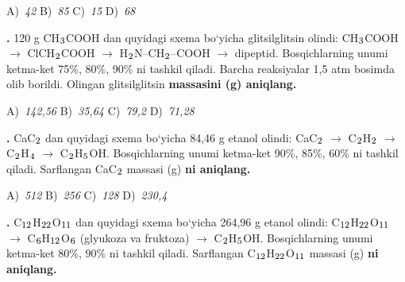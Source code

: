 \documentclass[11pt,a4paper]{article}
\renewcommand{\textsubscript}[1]{\ensuremath{_{\text{\fontsize{8}{8}\selectfont #1}}}}
\newcommand{\qn}[1]{\textbf{\fontsize{11.5}{13}\selectfont #1}}
\newcommand{\qsep}{\par\vspace{13pt}}
\begin{document}
\begin{multicols}{2}
\noindent A)~\textsl{42} \hfill B)~\textsl{85} \hfill C)~\textsl{15} \hfill D)~\textsl{68}\par
\qsep
\noindent\qn{27.} 120 g CH\textsubscript{3}COOH dan quyidagi sxema bo`yicha glitsilglitsin olindi: CH\textsubscript{3}COOH $\to$ ClCH\textsubscript{2}COOH $\to$ H\textsubscript{2}N--CH\textsubscript{2}--COOH $\to$ dipeptid. Bosqichlarning unumi ketma-ket 75\%, 80\%, 90\% ni tashkil qiladi. Barcha reaksiyalar 1,5 atm bosimda olib borildi. Olingan glitsilglitsin \textbf{massasini (g) aniqlang.}

\noindent A)~\textsl{142,56} \hfill B)~\textsl{35,64} \hfill C)~\textsl{79,2} \hfill D)~\textsl{71,28}\par
\qsep
\noindent\qn{28.} CaC\textsubscript{2} dan quyidagi sxema bo`yicha 84,46 g etanol olindi: CaC\textsubscript{2} $\to$ C\textsubscript{2}H\textsubscript{2} $\to$ C\textsubscript{2}H\textsubscript{4} $\to$ C\textsubscript{2}H\textsubscript{5}OH. Bosqichlarning unumi ketma-ket 90\%, 85\%, 60\% ni tashkil qiladi. Sarflangan CaC\textsubscript{2} massasi (g) \textbf{ni aniqlang.}

\noindent A)~\textsl{512} \hfill B)~\textsl{256} \hfill C)~\textsl{128} \hfill D)~\textsl{230,4}\par
\qsep
\noindent\qn{29.} C\textsubscript{12}H\textsubscript{22}O\textsubscript{11} dan quyidagi sxema bo`yicha 264,96 g etanol olindi: C\textsubscript{12}H\textsubscript{22}O\textsubscript{11} $\to$ C\textsubscript{6}H\textsubscript{12}O\textsubscript{6} (glyukoza va fruktoza) $\to$ C\textsubscript{2}H\textsubscript{5}OH. Bosqichlarning unumi ketma-ket 80\%, 90\% ni tashkil qiladi. Sarflangan C\textsubscript{12}H\textsubscript{22}O\textsubscript{11} massasi (g) \textbf{ni aniqlang.}


\end{multicols}
\end{document}

